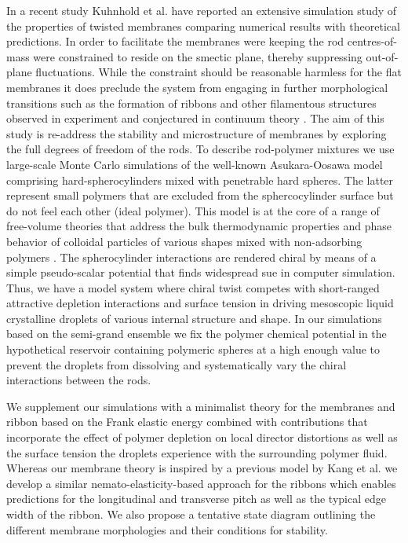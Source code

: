 In a recent study Kuhnhold et al. \cite{kuhnhold2022colloidal} have reported an extensive simulation study of the properties of twisted membranes comparing numerical results with theoretical predictions. In order to facilitate the membranes were keeping the rod centres-of-mass were constrained to reside on the smectic plane, thereby suppressing out-of-plane fluctuations. While the constraint should be reasonable harmless for the flat membranes it does preclude the system from engaging in further morphological transitions such as the formation of ribbons and other filamentous structures observed in experiment \cite{Gibaud2012} and conjectured in continuum theory \cite{kaplan2010theory,kang_sm2016}. The aim of this study is re-address the stability and microstructure of membranes by exploring the full degrees of freedom of the rods. To describe rod-polymer mixtures we use large-scale Monte Carlo simulations of the well-known Asukara-Oosawa model comprising hard-spherocylinders mixed with penetrable hard spheres. The latter represent small polymers that are excluded from the sphercocylinder surface but do not feel each other (ideal polymer). This model is at the core of a range of free-volume theories that address the bulk thermodynamic properties and phase behavior of colloidal particles of  various shapes mixed with non-adsorbing polymers \cite{LekkerkerkerTuinier2011}. The spherocylinder interactions are rendered chiral by means of a simple pseudo-scalar potential that finds widespread sue in computer simulation. Thus, we have a model system where chiral twist competes with short-ranged attractive depletion interactions and surface tension in driving mesoscopic liquid crystalline droplets of various internal structure and shape.  In our simulations based on the semi-grand ensemble we fix the polymer chemical potential in the hypothetical reservoir containing polymeric spheres at a high enough value to prevent the droplets from dissolving and systematically vary the chiral interactions between the rods.

We supplement our simulations with a minimalist theory for the membranes and ribbon based on the Frank elastic energy combined with contributions that incorporate the effect of polymer depletion on local director distortions as well as the surface tension the droplets experience with the surrounding polymer fluid. Whereas our membrane theory is inspired by a previous model by Kang et al. \cite{kang_sm2016,kang2017chiral} we develop a similar nemato-elasticity-based  approach for the ribbons which enables predictions for the longitudinal and transverse pitch as well as the typical edge width of the ribbon. We also propose a tentative state diagram outlining the different membrane morphologies and their conditions for stability.

